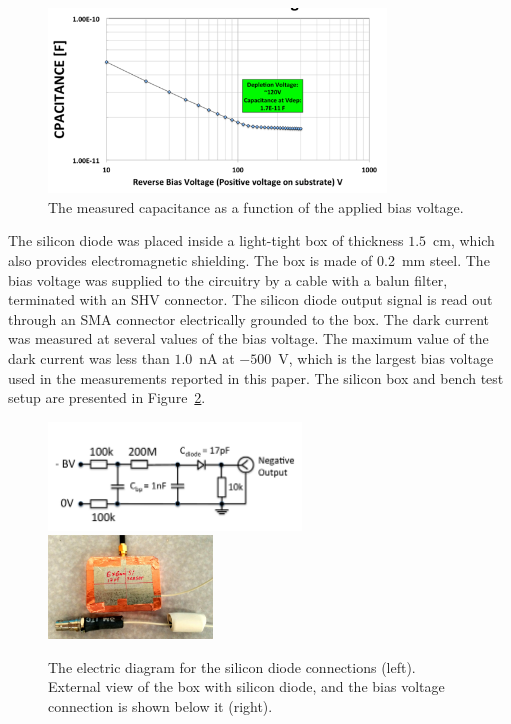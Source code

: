\documentclass[preprint,1p]{elsarticle}
\begin{document}
\begin{figure}[htbp] 
\centering
\includegraphics[width=0.8\textwidth]{plots/SiliconDiodeCV.png} 
\caption{The measured capacitance as a function of the applied bias voltage.} 
\label{fig:SiliconDiode} 
\end{figure} 

The silicon diode was placed inside a light-tight box of thickness $1.5$~cm,
which also provides electromagnetic shielding. The box is made of 0.2~mm steel.
The bias voltage was supplied to the circuitry by a cable with a balun filter,
terminated with an SHV connector. The silicon diode output signal is read out
through an SMA connector electrically grounded to the box. The dark current was
measured at several values of the bias voltage. The maximum value of the dark
current was less than $1.0$~nA at $-500$~V, which is the largest bias voltage
used in the measurements reported in this paper. The silicon box and bench test
setup are presented in Figure~\ref{fig:SiliconPad}. 

\begin{figure}[htbp] 
\centering
\includegraphics[width=0.60\textwidth]{plots/SiliconDiodeDiagram.pdf} 
\includegraphics[width=0.39\textwidth]{plots/SiliconDiodeBox.jpg} 
\caption{The electric diagram for the silicon diode connections (left). External
view of the box with silicon diode, and the bias voltage connection is shown
below it (right).} 
\label{fig:SiliconPad} 
\end{figure} 
\end{document}
